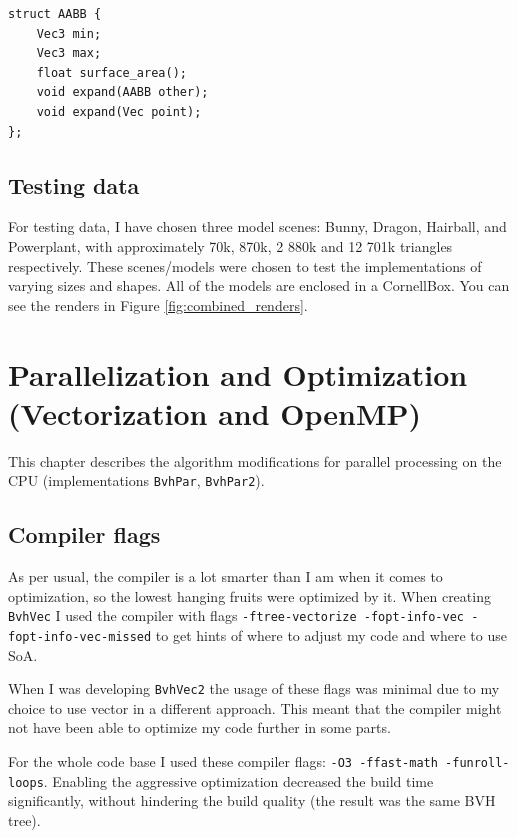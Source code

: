 \documentclass[10pt,a4paper,twocolumn]{article}
\begin{document}
\begin{lstlisting}
struct AABB {
    Vec3 min;
    Vec3 max;
    float surface_area();
    void expand(AABB other);
    void expand(Vec point);
};

\end{lstlisting}
\subsection{Testing data}
For testing data, I have chosen three model scenes: Bunny, Dragon, Hairball, and Powerplant, with approximately 70k, 870k, 2 880k and 12 701k triangles respectively. These scenes/models were chosen to test the implementations of varying sizes and shapes. All of the models are enclosed in a CornellBox. You can see the renders in Figure \ref{fig:combined_renders}.


\section{Parallelization and Optimization (Vectorization and OpenMP)}

This chapter describes the algorithm modifications for parallel processing on the CPU (implementations \texttt{BvhPar}, \texttt{BvhPar2}).

\subsection{Compiler flags}

As per usual, the compiler is a lot smarter than I am when it comes to optimization, so the lowest hanging fruits were optimized by it. When creating \texttt{BvhVec} I used the compiler with flags \texttt{-ftree-vectorize -fopt-info-vec -fopt-info-vec-missed} to get hints of where to adjust my code and where to use SoA.

When I was developing \texttt{BvhVec2} the usage of these flags was minimal due to my choice to use vector in a different approach. This meant that the compiler might not have been able to optimize my code further in some parts.

For the whole code base I used these compiler flags: \texttt{-O3 -ffast-math -funroll-loops}. Enabling the aggressive optimization decreased the build time significantly, without hindering the build quality (the result was the same BVH tree).
\end{document}
